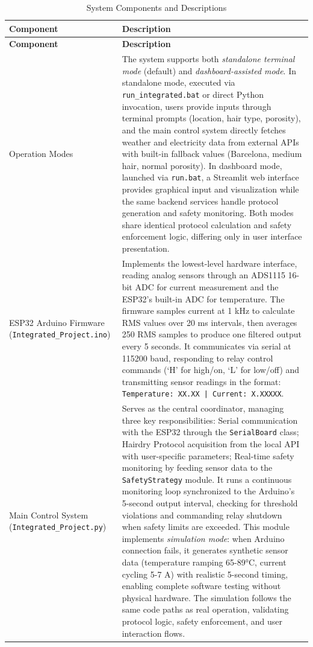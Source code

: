 \documentclass[11pt,a4paper]{article}
\begin{document}
\begin{longtable}{|L{0.3\textwidth}|p{0.65\textwidth}|}
\caption{System Components and Descriptions}
\label{tab:system_components} \\
\hline
\textbf{Component} & \textbf{Description} \\
\hline
\endfirsthead
\hline
\textbf{Component} & \textbf{Description} \\
\hline
\endhead
\hline
\endfoot
\hline
\endlastfoot
Operation Modes & The system supports both \emph{standalone terminal mode} (default) and \emph{dashboard-assisted mode}. In standalone mode, executed via \texttt{run\_integrated.bat} or direct Python invocation, users provide inputs through terminal prompts (location, hair type, porosity), and the main control system directly fetches weather and electricity data from external APIs with built-in fallback values (Barcelona, medium hair, normal porosity). In dashboard mode, launched via \texttt{run.bat}, a Streamlit web interface provides graphical input and visualization while the same backend services handle protocol generation and safety monitoring. Both modes share identical protocol calculation and safety enforcement logic, differing only in user interface presentation. \\
\hline
ESP32 Arduino Firmware (\texttt{Integrated\_Project.ino}) & Implements the lowest-level hardware interface, reading analog sensors through an ADS1115 16-bit ADC for current measurement and the ESP32's built-in ADC for temperature. The firmware samples current at 1 kHz to calculate RMS values over 20 ms intervals, then averages 250 RMS samples to produce one filtered output every 5 seconds. It communicates via serial at 115200 baud, responding to relay control commands (`H' for high/on, `L' for low/off) and transmitting sensor readings in the format: \texttt{Temperature: XX.XX | Current: X.XXXXX}. \\
\hline
Main Control System (\texttt{Integrated\_Project.py}) & Serves as the central coordinator, managing three key responsibilities: Serial communication with the ESP32 through the \texttt{SerialBoard} class; Hairdry Protocol acquisition from the local API with user-specific parameters; Real-time safety monitoring by feeding sensor data to the \texttt{SafetyStrategy} module. It runs a continuous monitoring loop synchronized to the Arduino's 5-second output interval, checking for threshold violations and commanding relay shutdown when safety limits are exceeded. This module implements \emph{simulation mode}: when Arduino connection fails, it generates synthetic sensor data (temperature ramping 65-89°C, current cycling 5-7 A) with realistic 5-second timing, enabling complete software testing without physical hardware. The simulation follows the same code paths as real operation, validating protocol logic, safety enforcement, and user interaction flows. \\

\end{longtable}
\end{document}
